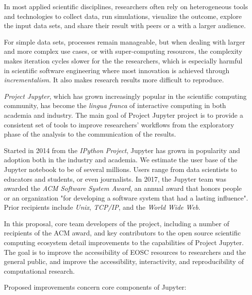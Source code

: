 In most applied scientific disciplines, researchers often rely on
heterogeneous tools and technologies to collect data, run simulations,
visualize the outcome, explore the input data sets, and share their
result with peers or a with a larger audience.

For simple data sets, processes remain manageable, but when dealing
with larger and more complex use cases, or with super-computing resources,
the complexity makes iteration cycles slower for the the researchers, which
is especially harmful in scientific software engineering where most innovation
is achieved through \emph{incrementalism}. It also makes research results more
difficult to reproduce.

\emph{Project Jupyter}, which has grown increasingly popular in the scientific
computing community, has become the \emph{lingua franca} of interactive
computing in both academia and industry. The main goal of Project Jupyter
project is to provide a consistent set of tools to improve researchers'
workflows from the exploratory phase of the analysis to the communication
of the results.

Started in 2014 from the \emph{IPython Project}, Jupyter has grown in
popularity and adoption both in the industry and academia. We estimate the user
base of the Jupyter notebook to be of several millions. Users range from data
scientists to educators and students, or even journalists. In 2017, the Jupyter
team was awarded the \emph{ACM Software System Award}, an annual award that
honors people or an organization "for developing a software system that had a
lasting influence". Prior recipients include \emph{Unix}, \emph{TCP/IP}, and
the \emph{World Wide Web}.

In this proposal, core team developers of the project, including a number of
recipients of the ACM award, and key contributors to the open source scientific
computing ecosystem detail improvements to the capabilities of Project Jupyter.
The goal is to improve the accessibility of EOSC resources to researchers and
the general public, and improve the accessibility, interactivity, and
reproducibility of computational research.

Proposed improvements concern core components of Jupyter:


